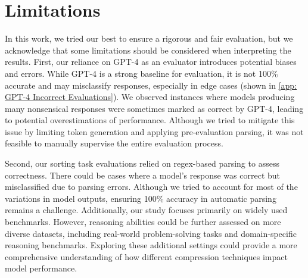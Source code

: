 \section*{Limitations}
\label{section:6}
In this work, we tried our best to ensure a rigorous and fair evaluation, but we acknowledge that some limitations should be considered when interpreting the results. First, our reliance on GPT-4 as an evaluator introduces potential biases and errors. While GPT-4 is a strong baseline for evaluation, it is not 100\% accurate and may misclassify responses, especially in edge cases (shown in \ref{app: GPT-4 Incorrect Evaluations}). We observed instances where models producing many nonsensical responses were sometimes marked as correct by GPT-4, leading to potential overestimations of performance. Although we tried to mitigate this issue by limiting token generation and applying pre-evaluation parsing, it was not feasible to manually supervise the entire evaluation process. 

Second, our sorting task evaluations relied on regex-based parsing to assess correctness. There could be cases where a model’s response was correct but misclassified due to parsing errors. Although we tried to account for most of the variations in model outputs, ensuring 100\% accuracy in automatic parsing remains a challenge. Additionally, our study focuses primarily on widely used benchmarks. However, reasoning abilities could be further assessed on more diverse datasets, including real-world problem-solving tasks and domain-specific reasoning benchmarks. Exploring these additional settings could provide a more comprehensive understanding of how different compression techniques impact model performance.
